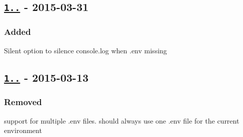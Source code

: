 \subsection*{\href{https://github.com/motdotla/dotenv/compare/v1.0.0...v1.1.0}{\tt 1..} -\/ 2015-\/03-\/31}

\subsubsection*{Added}


\begin{DoxyItemize}
\item Silent option to silence {\ttfamily console.\+log} when {\ttfamily .env} missing
\end{DoxyItemize}

\subsection*{\href{https://github.com/motdotla/dotenv/compare/v0.4.0...v1.0.0}{\tt 1..} -\/ 2015-\/03-\/13}

\subsubsection*{Removed}


\begin{DoxyItemize}
\item support for multiple {\ttfamily .env} files. should always use one {\ttfamily .env} file for the current environment 
\end{DoxyItemize}